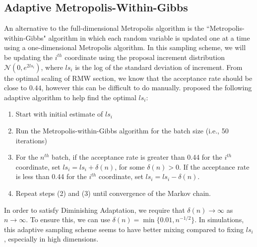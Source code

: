 \documentclass[twoside]{article}
\begin{document}
\subsection{Adaptive Metropolis-Within-Gibbs}
An alternative to the full-dimensional Metropolis algorithm is the ``Metropolis-within-Gibbs" algorithm in which each random variable is updated one at a time using a one-dimensional Metropolis algorithm. In this sampling scheme, we will be updating the $i^{th}$ coordinate using the proposal increment distribution $\mathcal{N}(0, e^{2ls_i})$, where $ls_i$ is the log of the standard deviation of increment. From the optimal scaling of RMW section, we know that the acceptance rate should be close to $0.44$, however this can be difficult to do manually. \citet{roberts2006harris} proposed the following adaptive algorithm to help find the optimal $ls_i$:
\begin{enumerate}
	\item Start with initial estimate of $ls_i$
	\item Run the Metropolis-within-Gibbs algorithm for the batch size (i.e., 50 iterations)
	\item For the $n^{th}$ batch, if the acceptance rate is greater than 0.44 for the $i^{th}$ coordinate, set $ls_i = ls_i + \delta(n)$, for some $\delta(n) > 0$. If the acceptance rate is less than 0.44 for the $i^{th}$ coordinate, set $ls_i = ls_i - \delta(n)$.
	\item Repeat steps (2) and (3) until convergence of the Markov chain.
\end{enumerate}
In order to satisfy Diminishing Adaptation, we require that $\delta(n) \rightarrow \infty$ as $n \rightarrow \infty$. To ensure this, we can use $\delta(n) = \min \{0.01, n^{-1/2}\}$. In simulations, this adaptive sampling scheme seems to have better mixing compared to fixing $ls_i$, especially in high dimensions.




\end{document}
